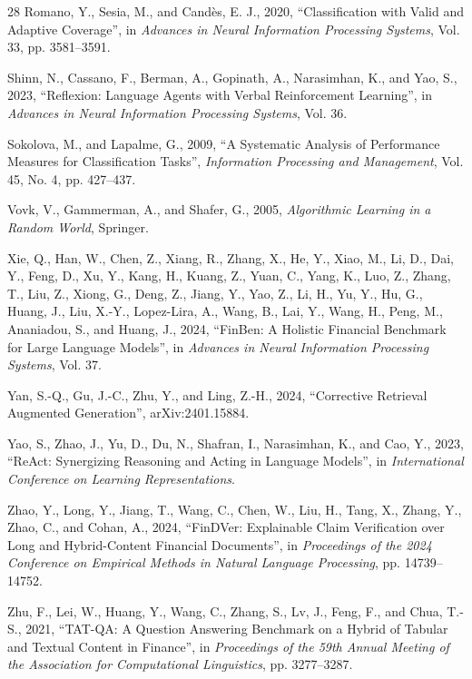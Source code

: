 \begin{thebibliography}{28}
Romano, Y., Sesia, M., and Cand\`es, E. J., 2020, ``Classification with Valid and Adaptive Coverage'', in \emph{Advances in Neural Information Processing Systems}, Vol. 33, pp. 3581--3591.

Shinn, N., Cassano, F., Berman, A., Gopinath, A., Narasimhan, K., and Yao, S., 2023, ``Reflexion: Language Agents with Verbal Reinforcement Learning'', in \emph{Advances in Neural Information Processing Systems}, Vol. 36.

Sokolova, M., and Lapalme, G., 2009, ``A Systematic Analysis of Performance Measures for Classification Tasks'', \emph{Information Processing and Management}, Vol. 45, No. 4, pp. 427--437.

Vovk, V., Gammerman, A., and Shafer, G., 2005, \emph{Algorithmic Learning in a Random World}, Springer.

Xie, Q., Han, W., Chen, Z., Xiang, R., Zhang, X., He, Y., Xiao, M., Li, D., Dai, Y., Feng, D., Xu, Y., Kang, H., Kuang, Z., Yuan, C., Yang, K., Luo, Z., Zhang, T., Liu, Z., Xiong, G., Deng, Z., Jiang, Y., Yao, Z., Li, H., Yu, Y., Hu, G., Huang, J., Liu, X.-Y., Lopez-Lira, A., Wang, B., Lai, Y., Wang, H., Peng, M., Ananiadou, S., and Huang, J., 2024, ``FinBen: A Holistic Financial Benchmark for Large Language Models'', in \emph{Advances in Neural Information Processing Systems}, Vol. 37.

Yan, S.-Q., Gu, J.-C., Zhu, Y., and Ling, Z.-H., 2024, ``Corrective Retrieval Augmented Generation'', arXiv:2401.15884.

Yao, S., Zhao, J., Yu, D., Du, N., Shafran, I., Narasimhan, K., and Cao, Y., 2023, ``ReAct: Synergizing Reasoning and Acting in Language Models'', in \emph{International Conference on Learning Representations}.

Zhao, Y., Long, Y., Jiang, T., Wang, C., Chen, W., Liu, H., Tang, X., Zhang, Y., Zhao, C., and Cohan, A., 2024, ``FinDVer: Explainable Claim Verification over Long and Hybrid-Content Financial Documents'', in \emph{Proceedings of the 2024 Conference on Empirical Methods in Natural Language Processing}, pp. 14739--14752.

Zhu, F., Lei, W., Huang, Y., Wang, C., Zhang, S., Lv, J., Feng, F., and Chua, T.-S., 2021, ``TAT-QA: A Question Answering Benchmark on a Hybrid of Tabular and Textual Content in Finance'', in \emph{Proceedings of the 59th Annual Meeting of the Association for Computational Linguistics}, pp. 3277--3287.



\end{thebibliography}
